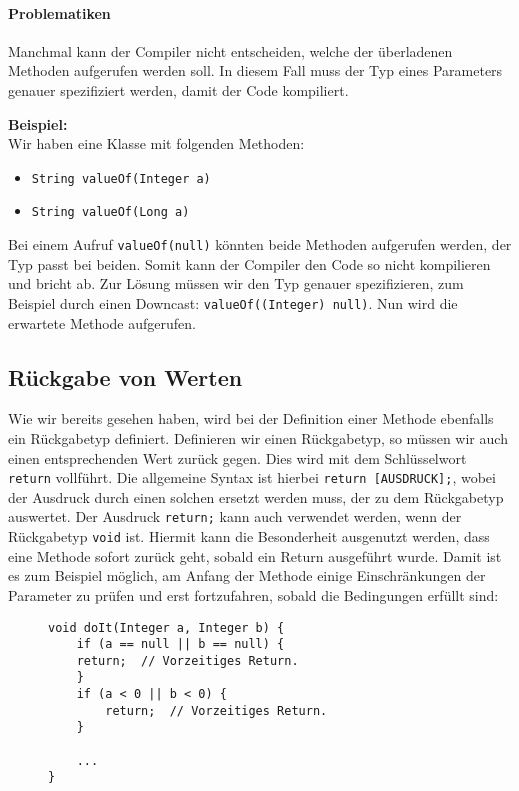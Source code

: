 	\paragraph{Problematiken}
		Manchmal kann der Compiler nicht entscheiden, welche der überladenen Methoden aufgerufen werden soll. In diesem Fall muss der Typ eines Parameters genauer spezifiziert werden, damit der Code kompiliert.
		
		\textbf{Beispiel:} \\
		Wir haben eine Klasse mit folgenden Methoden:
		\begin{itemize}
			\item \lstinline|String valueOf(Integer a)|
			\item \lstinline|String valueOf(Long a)|
		\end{itemize}
		Bei einem Aufruf \lstinline|valueOf(null)| könnten beide Methoden aufgerufen werden, der Typ passt bei beiden. Somit kann der Compiler den Code so nicht kompilieren und bricht ab. Zur Lösung müssen wir den Typ genauer spezifizieren, zum Beispiel durch einen Downcast: \lstinline|valueOf((Integer) null)|. Nun wird die erwartete Methode aufgerufen.

\subsection{Rückgabe von Werten}
	Wie wir bereits gesehen haben, wird bei der Definition einer Methode ebenfalls ein Rückgabetyp definiert. Definieren wir einen Rückgabetyp, so müssen wir auch einen entsprechenden Wert zurück gegen. Dies wird mit dem Schlüsselwort \lstinline|return| vollführt. Die allgemeine Syntax ist hierbei \lstinline|return [AUSDRUCK];|, wobei der Ausdruck durch einen solchen ersetzt werden muss, der zu dem Rückgabetyp auswertet. Der Ausdruck \lstinline|return;| kann auch verwendet werden, wenn der Rückgabetyp \lstinline|void| ist. Hiermit kann die Besonderheit ausgenutzt werden, dass eine Methode sofort zurück geht, sobald ein Return ausgeführt wurde. Damit ist es zum Beispiel möglich, am Anfang der Methode einige Einschränkungen der Parameter zu prüfen und erst fortzufahren, sobald die Bedingungen erfüllt sind:
	\begin{figure}[H]
		\centering
		\begin{lstlisting}
void doIt(Integer a, Integer b) {
	if (a == null || b == null) {
	return;  // Vorzeitiges Return.
	}
	if (a < 0 || b < 0) {
		return;  // Vorzeitiges Return.
	}
	
	...
}
\end{lstlisting}
	\end{figure}
	
